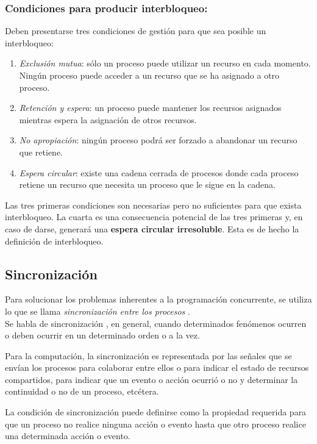 \subsubsection{Condiciones para producir interbloqueo: }
\noindent Deben presentarse tres condiciones de gestión para que sea posible un interbloqueo:
\begin{enumerate}
    \item \textit{Exclusión mutua}: sólo un proceso puede utilizar un recurso en cada momento. Ningún proceso puede acceder a un recurso que se ha asignado a otro proceso.
    
    \item \textit{Retención y espera}: un proceso puede mantener los recursos asignados mientras espera la asignación de otros recursos.
    
    \item \textit{No apropiación}: ningún proceso podrá ser forzado a abandonar un recurso que retiene.
    
    \item \textit{Espera circular}: existe una cadena cerrada de procesos donde cada proceso retiene un recurso que necesita un proceso que le sigue en la cadena.
\end{enumerate}

Las tres primeras condiciones son necesarias pero no suficientes para que exista interbloqueo.
La cuarta es una consecuencia potencial de las tres primeras y, en caso de darse, generará una \textbf{espera circular irresoluble}. Esta es de hecho la definición de interbloqueo.

\subsection{Sincronización}
Para solucionar los problemas inherentes a la programación concurrente, se utiliza lo que se llama \textit{sincronización entre los procesos} . \\
Se habla de sincronización , en general, cuando determinados fenómenos ocurren o deben ocurrir en un determinado orden o a la vez.
\par Para la computación, la sincronización es representada por las señales que se envían los procesos para colaborar entre ellos o para indicar el estado de recursos compartidos, para indicar que un evento o acción ocurrió o no y determinar la continuidad o no de un proceso, etcétera.
\par La condición de sincronización puede definirse como la propiedad requerida para que un proceso no realice ninguna acción o evento hasta que otro proceso realice una determinada acción o evento.


